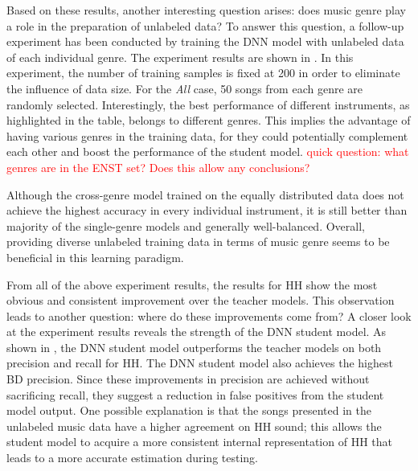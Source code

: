 \documentclass{article}
\begin{document}
Based on these results, another interesting question arises: does music genre play a role in the preparation of unlabeled data? To answer this question, a follow-up experiment has been conducted by training the DNN model with unlabeled data of each individual genre. The experiment results are shown in . In this experiment, the number of training samples is fixed at 200 in order to eliminate the influence of data size. For the \textit{All} case, 50 songs from each genre are randomly selected. Interestingly, the best performance of different instruments, as highlighted in the table, belongs to different genres. This implies the advantage of having various genres in the training data, for they could potentially complement each other and boost the performance of the student model. {\textcolor{red}{quick question: what genres are in the ENST set? Does this allow any conclusions?}}

Although the cross-genre model trained on the equally distributed data does not achieve the highest accuracy in every individual instrument, it is still better than majority of the single-genre models and generally well-balanced. Overall, providing diverse unlabeled training data in terms of music genre seems to be beneficial in this learning paradigm. %
%


From all of the above experiment results, the results for HH show the most obvious and consistent improvement over the teacher models. This observation leads to another question: where do these improvements come from? A closer look at the experiment results reveals the strength of the DNN student model. As shown in , the DNN student model outperforms the teacher models on both precision and recall for HH. The DNN student model also achieves the highest BD precision. Since these improvements in precision are achieved without sacrificing recall, they suggest a reduction in false positives from the student model output. One possible explanation is that the songs presented in the unlabeled music data have a higher agreement on HH sound; this allows the student model to acquire a more consistent internal representation of HH that leads to a more accurate estimation during testing. %
\end{document}
